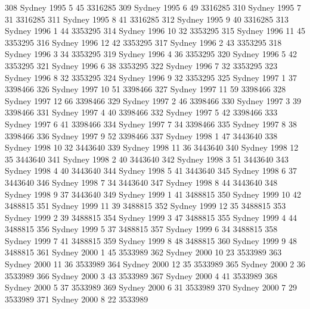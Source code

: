 \documentclass[a4paper]{article}                %
\begin{document}
\begin{Schunk}
\begin{Soutput}
308   Sydney  1995     5      45 3316285
309   Sydney  1995     6      49 3316285
310   Sydney  1995     7      31 3316285
311   Sydney  1995     8      41 3316285
312   Sydney  1995     9      40 3316285
313   Sydney  1996     1      44 3353295
314   Sydney  1996    10      32 3353295
315   Sydney  1996    11      45 3353295
316   Sydney  1996    12      42 3353295
317   Sydney  1996     2      43 3353295
318   Sydney  1996     3      34 3353295
319   Sydney  1996     4      36 3353295
320   Sydney  1996     5      42 3353295
321   Sydney  1996     6      38 3353295
322   Sydney  1996     7      32 3353295
323   Sydney  1996     8      32 3353295
324   Sydney  1996     9      32 3353295
325   Sydney  1997     1      37 3398466
326   Sydney  1997    10      51 3398466
327   Sydney  1997    11      59 3398466
328   Sydney  1997    12      66 3398466
329   Sydney  1997     2      46 3398466
330   Sydney  1997     3      39 3398466
331   Sydney  1997     4      40 3398466
332   Sydney  1997     5      42 3398466
333   Sydney  1997     6      41 3398466
334   Sydney  1997     7      34 3398466
335   Sydney  1997     8      38 3398466
336   Sydney  1997     9      52 3398466
337   Sydney  1998     1      47 3443640
338   Sydney  1998    10      32 3443640
339   Sydney  1998    11      36 3443640
340   Sydney  1998    12      35 3443640
341   Sydney  1998     2      40 3443640
342   Sydney  1998     3      51 3443640
343   Sydney  1998     4      40 3443640
344   Sydney  1998     5      41 3443640
345   Sydney  1998     6      37 3443640
346   Sydney  1998     7      34 3443640
347   Sydney  1998     8      44 3443640
348   Sydney  1998     9      37 3443640
349   Sydney  1999     1      41 3488815
350   Sydney  1999    10      42 3488815
351   Sydney  1999    11      39 3488815
352   Sydney  1999    12      35 3488815
353   Sydney  1999     2      39 3488815
354   Sydney  1999     3      47 3488815
355   Sydney  1999     4      44 3488815
356   Sydney  1999     5      37 3488815
357   Sydney  1999     6      34 3488815
358   Sydney  1999     7      41 3488815
359   Sydney  1999     8      48 3488815
360   Sydney  1999     9      48 3488815
361   Sydney  2000     1      45 3533989
362   Sydney  2000    10      23 3533989
363   Sydney  2000    11      36 3533989
364   Sydney  2000    12      35 3533989
365   Sydney  2000     2      36 3533989
366   Sydney  2000     3      43 3533989
367   Sydney  2000     4      41 3533989
368   Sydney  2000     5      37 3533989
369   Sydney  2000     6      31 3533989
370   Sydney  2000     7      29 3533989
371   Sydney  2000     8      22 3533989

\end{Soutput}
\end{Schunk}
\end{document}
